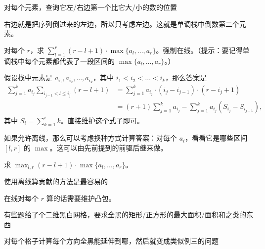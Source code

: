     \begin{example}[求前驱后继]    
    对每个元素，查询它左/右边第一个比它大/小的数的位置
    \end{example}
    \begin{solution}
        右边就是把序列倒过来的左边，所以只考虑左边。这就是单调栈中倒数第二个元素。
    \end{solution}

    \begin{example}[稍复杂一些的信息维护]
        对每个 $r$，求 $\sum_{l=1}^r (r-l+1)\cdot \max\{a_l,\ldots,a_r\}$。强制在线。（提示：要记得单调栈中每个元素都代表了一段区间的 $\max\{a_l,\ldots,a_r\}$。）
    \end{example}
    \begin{solution}
        假设栈中元素是 $a_{i_1}, a_{i_2}, \ldots, a_{i_k}$，其中 $i_1 < i_2 < \ldots < i_k$，那么答案是
        $$
        \begin{aligned}
        \sum_{j=1}^k a_{i_j}\sum_{i_{j-1}<l\le i_j}(r-l+1)&=\sum_{j=1}^k a_{i_j}\cdot(i_j-i_{j-1})\cdot(r-i_j+1)\\
        &=(r+1)\sum_{j=1}^k a_{i_j}-\sum_{j=1}^k a_{i_j}(S_{i_j}-S_{i_{j-1}}),
        \end{aligned}
        $$
        其中 $S_i=\sum_{k=1}^i k$。直接维护这个式子即可。
    \end{solution}
    \begin{solution}[离线的另解]
        如果允许离线，那么可以考虑换种方式计算答案：对每个 $a_i$，看看它是哪些区间 $[l,r]$ 的 $\max$。这可以由先前提到的前驱后继来做。
    \end{solution}

    \begin{example}[最值版本]
        求 $\max_{l,r}(r-l+1)\cdot\max\{a_l,\ldots,a_r\}$。
    \end{example}
    \begin{solution}
        使用离线算贡献的方法是最容易的

    在线对每个 $r$ 算的话需要维护凸包。
    \end{solution}

\begin{example}[悬线法]
    有些题给了个二维黑白网格，要求全黑的矩形/正方形的最大面积/面积和之类的东西

    对每个格子计算每个方向全黑能延伸到哪，然后就变成类似例三的问题
\end{example}

